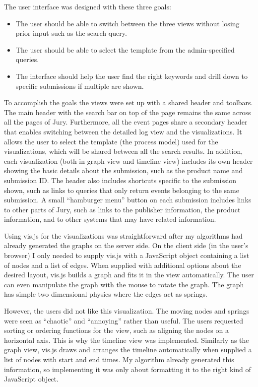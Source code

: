 The user interface was designed with these three goals:
\begin{itemize}
    \item The user should be able to switch between the three views without losing prior input such as the search query.
    \item The user should be able to select the template from the admin-specified queries.
    \item The interface should help the user find the right keywords and drill down to specific submissions if multiple are shown.
\end{itemize}

To accomplish the goals the views were set up with a shared header and toolbars.
The main header with the search bar on top of the page remains the same across all the pages of Jury.
Furthermore, all the event pages share a secondary header that enables switching between the detailed log view and the visualizations. 
It allows the user to select the template (the process model) used for the visualizations, which will be shared between all the search results.
In addition, each visualization (both in graph view and timeline view) includes its own header showing the basic details about the submission, such as the product name and submission ID. The header also includes shortcuts specific to the submission shown, such as links to queries that only return events belonging to the same submission.
A small ``hamburger menu'' button on each submission includes links to other parts of Jury, such as links to the publisher information, the product information, and to other systems that may have related information.

Using vis.js for the visualizations was straightforward after my algorithms had already generated the graphs on the server side. 
On the client side (in the user's browser) I only needed to supply vis.js with a JavaScript object containing a list of nodes and a list of edges. When supplied with additional options about the desired layout, vis.js builds a graph and fits it in the view automatically. The user can even manipulate the graph with the mouse to rotate the graph. The graph has simple two dimensional physics where the edges act as springs.

However, the users did not like this visualization. The moving nodes and springs were seen as ``chaotic'' and ``annoying'' rather than useful. 
The users requested sorting or ordering functions for the view, such as aligning the nodes on a horizontal axis. 
This is why the timeline view was implemented. 
Similarly as the graph view, vis.js draws and arranges the timeline automatically when supplied a list of nodes with start and end times.
My algorithm already generated this information, so implementing it was only about formatting it to the right kind of JavaScript object.

